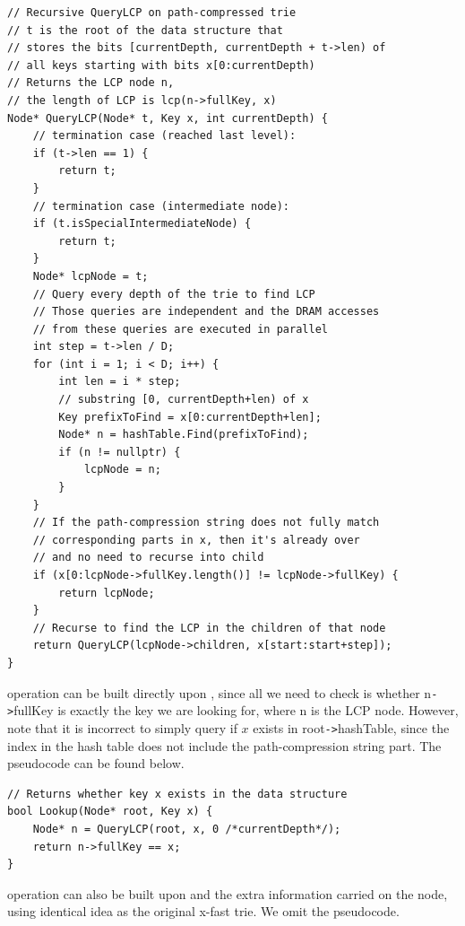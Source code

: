\documentclass[11pt, usletter]{article}
\begin{document}
\singlespacing\begin{codebox}
\begin{verbatim}
// Recursive QueryLCP on path-compressed trie
// t is the root of the data structure that 
// stores the bits [currentDepth, currentDepth + t->len) of 
// all keys starting with bits x[0:currentDepth)
// Returns the LCP node n, 
// the length of LCP is lcp(n->fullKey, x)
Node* QueryLCP(Node* t, Key x, int currentDepth) {
    // termination case (reached last level):
    if (t->len == 1) {
        return t;
    }
    // termination case (intermediate node):
    if (t.isSpecialIntermediateNode) {
        return t;
    }
    Node* lcpNode = t;
    // Query every depth of the trie to find LCP
    // Those queries are independent and the DRAM accesses 
    // from these queries are executed in parallel
    int step = t->len / D;
    for (int i = 1; i < D; i++) {
        int len = i * step;
        // substring [0, currentDepth+len) of x
        Key prefixToFind = x[0:currentDepth+len];
        Node* n = hashTable.Find(prefixToFind);
        if (n != nullptr) {
            lcpNode = n;
        } 
    }
    // If the path-compression string does not fully match 
    // corresponding parts in x, then it's already over
    // and no need to recurse into child
    if (x[0:lcpNode->fullKey.length()] != lcpNode->fullKey) {
        return lcpNode;
    }
    // Recurse to find the LCP in the children of that node
    return QueryLCP(lcpNode->children, x[start:start+step]);
}
\end{verbatim}
\end{codebox}\doublespacing

\lookup operation can be built directly upon \QueryLCP, 
since all we need to check is whether n\verb|->|fullKey is exactly the key we are looking for, 
where n is the LCP node.
However, note that it is incorrect to simply query if $x$ exists in root\verb|->|hashTable, 
since the index in the hash table does not include the path-compression string part.
The pseudocode can be found below.

\singlespacing\begin{codebox}
\begin{verbatim}
// Returns whether key x exists in the data structure
bool Lookup(Node* root, Key x) {
    Node* n = QueryLCP(root, x, 0 /*currentDepth*/);
    return n->fullKey == x;
}
\end{verbatim}
\end{codebox}\doublespacing

\lowerbound operation can also be built upon \QueryLCP and the extra information 
carried on the node, using identical idea as the original x-fast trie. We omit the pseudocode.
\end{document}
